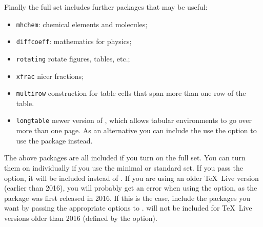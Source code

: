 Finally the full set includes further packages that may be useful:
\begin{itemize}\setlength{\parskip}{0pt}\setlength{\itemsep}{0pt}
\item \texttt{mhchem}: chemical elements and molecules;
\item \texttt{diffcoeff}: mathematics for physics;
\item \texttt{rotating} rotate figures, tables, etc.;
\item \texttt{xfrac} nicer fractions;
\item \texttt{multirow} construction for table cells that span more than one row of the table.
\item \texttt{longtable} newer version of , which allows tabular environments to go over more than one page.
  As an alternative you can include the use the option  to use the  package instead.
\end{itemize}
The above packages are all included if you turn on the full set.
You can turn them on individually if you use the minimal or standard set.
If you pass the  option, it will be included instead of .
 If you are using an older \TeX\ Live version (earlier than 2016),
you will probably get an error when using the  option,
as the  package was first released in 2016.
If this is the case, include the packages you want by passing the appropriate options to .
  will not be included for \TeX\ Live versions older than 2016 (defined by the  option).

